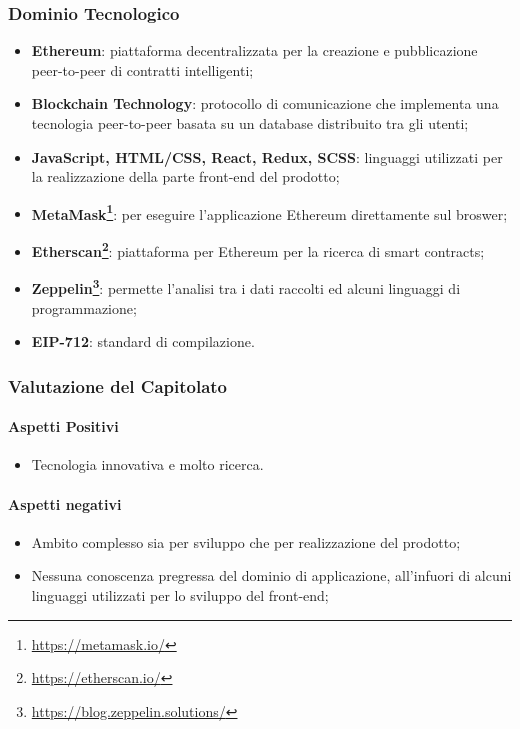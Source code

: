 \subsubsection{Dominio Tecnologico}

\begin{itemize}
  \item \textbf{Ethereum\glossario}: piattaforma decentralizzata per la creazione e pubblicazione peer-to-peer di contratti intelligenti;
  \item \textbf{Blockchain Technology\glossario}: protocollo di comunicazione che implementa una tecnologia peer-to-peer basata su un database distribuito tra gli utenti;
  \item \textbf{JavaScript, HTML/CSS, React\glossario, Redux\glossario, SCSS\glossario}: linguaggi utilizzati per la realizzazione della parte front-end del prodotto;
  \item \textbf{MetaMask\footnote{\url{https://metamask.io/}}\glossario}: per eseguire l'applicazione Ethereum direttamente sul broswer;
  \item \textbf{Etherscan\footnote{\url{https://etherscan.io/}}\glossario}: piattaforma per Ethereum per la ricerca di smart contracts;
  \item \textbf{Zeppelin\footnote{\url{https://blog.zeppelin.solutions/}}\glossario}: permette l'analisi tra i dati raccolti ed alcuni linguaggi di programmazione;
  \item \textbf{EIP-712}: standard di compilazione.
\end{itemize}

\subsubsection{Valutazione del Capitolato}
\paragraph{Aspetti Positivi}
\begin{itemize}
  \item Tecnologia innovativa e molto ricerca.
\end{itemize}

\paragraph{Aspetti negativi}
\begin{itemize}
  \item Ambito complesso sia per sviluppo che per realizzazione del prodotto;
  \item Nessuna conoscenza pregressa del dominio di applicazione, all'infuori di alcuni linguaggi utilizzati per lo sviluppo del front-end;
\end{itemize}

